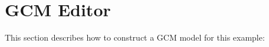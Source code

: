 \documentclass[titlepage,11pt]{article}
\begin{document}
 

\clearpage

\section{GCM Editor}

This section describes how to construct a GCM model for this example:
\end{document}
